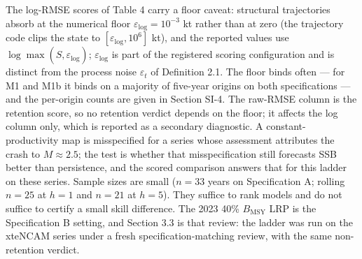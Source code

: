 \documentclass[11pt]{article}
\begin{document}
The log-RMSE scores of Table 4 carry a floor caveat: structural
trajectories absorb at the numerical floor
\(\varepsilon_{\mathrm{log}} = 10^{-3}\) kt rather than at zero (the
trajectory code clips the state to
\([\varepsilon_{\mathrm{log}}, 10^{6}]\) kt), and the reported values
use \(\log\max(\hat S, \varepsilon_{\mathrm{log}})\);
\(\varepsilon_{\mathrm{log}}\) is part of the registered scoring
configuration and is distinct from the process noise \(\varepsilon_t\)
of Definition 2.1. The floor binds often --- for M1 and M1b it binds on a majority of
five-year origins on both specifications --- and the per-origin counts
are given in Section SI-4. The raw-RMSE column is the retention score, so no retention verdict
depends on the floor; it affects the log column only, which is reported
as a secondary diagnostic. A constant-productivity map is
misspecified for a series whose assessment attributes the crash to
\(M \approx 2.5\); the test is whether that misspecification still
forecasts SSB better than persistence, and the scored comparison answers
that for this ladder on these series. Sample sizes are small
(\(n=33\) years on Specification A; rolling \(n=25\) at \(h=1\) and
\(n=21\) at \(h=5\)). They suffice to rank models and do not suffice to
certify a small skill difference. The 2023 40\% \(B_{\mathrm{MSY}}\) LRP
is the Specification B setting, and Section 3.3 is that review: the
ladder was run on the xteNCAM series under a fresh
specification-matching review, with the same non-retention verdict.
\end{document}
